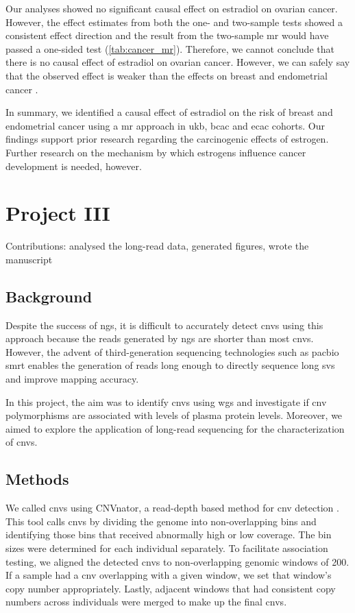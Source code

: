 \documentclass[twoside=false]{scrbook}
\begin{document}
Our analyses showed no significant causal effect on estradiol on ovarian cancer.
However, the effect estimates from both the one- and two-sample tests showed a consistent effect direction and the result from the two-sample \gls{mr} would have passed a one-sided test (\cref{tab:cancer_mr}).
Therefore, we cannot conclude that there is no causal effect of estradiol on ovarian cancer.
However, we can safely say that the observed effect is weaker than the effects on breast and endometrial cancer \cite{Trabert2016,Key2011,Rodriguez2019}.

In summary, we identified a causal effect of estradiol on the risk of breast and endometrial cancer using a \gls{mr} approach in \gls{ukb}, \gls{bcac} and \gls{ecac} cohorts.
Our findings support prior research regarding the carcinogenic effects of estrogen.
Further research on the mechanism by which estrogens influence cancer development is needed, however.

\chapter{Project III}
{
    \parindent 0pt \color{gray}
    Contributions: analysed the long-read data, generated figures, wrote the manuscript
}

\section{Background}
Despite the success of \gls{ngs}, it is difficult to accurately detect \glspl{cnv} using this approach because the reads generated by \gls{ngs} are shorter than most \glspl{cnv}.
However, the advent of third-generation sequencing technologies such as \gls{pacbio} \gls{smrt} enables the generation of reads long enough to directly sequence long \glspl{sv} and improve mapping accuracy.

In this project, the aim was to identify \glspl{cnv} using \gls{wgs} and investigate if \gls{cnv} polymorphisms are associated with levels of plasma protein levels.
Moreover, we aimed to explore the application of long-read sequencing for the characterization of \glspl{cnv}.

\section{Methods}
We called \glspl{cnv} using \textsf{CNVnator}, a read-depth based method for \gls{cnv} detection \cite{Abyzov2011b}.
This tool calls \glspl{cnv} by dividing the genome into non-overlapping bins and identifying those bins that received abnormally high or low coverage.
The bin sizes were determined for each individual separately.
To facilitate association testing, we aligned the detected \glspl{cnv} to non-overlapping genomic windows of \qty{200}{\base}.
If a sample had a \gls{cnv} overlapping with a given window, we set that window's copy number appropriately.
Lastly, adjacent windows that had consistent copy numbers across individuals were merged to make up the final \glspl{cnv}.
\end{document}
